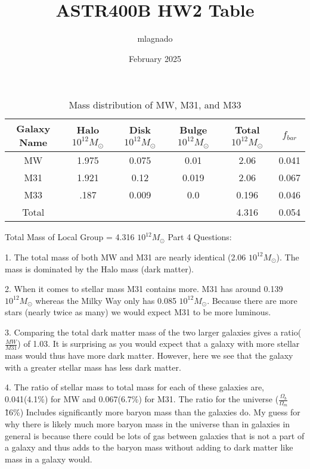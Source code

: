 \documentclass{article}
\title{ASTR400B HW2 Table}
\author{mlagnado }
\date{February 2025}
\begin{document}
\maketitle



    \begin{table}[h]
    \begin{tabular}{|c|c|c|c|c|c|} \hline  
         Galaxy Name&  Halo $10^{12} M_{\odot}$&   Disk $10^{12} M_{\odot}$&  Bulge $10^{12} M_{\odot}$&  Total $10^{12} M_{\odot}$& $f_{bar}$\\ \hline  
         MW&  1.975&  0.075&  0.01&  2.06& 0.041\\ \hline  
         M31&  1.921&  0.12&  0.019&  2.06& 0.067\\ \hline  
         M33&  .187&  0.009&  0.0&  0.196& 0.046\\ \hline  
         Total& & & &4.316& 0.054\\ \hline 
    \end{tabular}
    \caption{Mass distribution of MW, M31, and M33}
    \label{tab:my_label}
\end{table}

Total Mass of Local Group = 4.316 $10^{12} M_{\odot}$ \newline
\newline Part 4 Questions:

1. The total mass of both MW and M31 are nearly identical (2.06 $10^{12} M_{\odot}$). The mass is dominated by the Halo mass (dark matter).


2. When it comes to stellar mass M31 contains more. M31 has around 0.139 $10^{12} M_{\odot}$ whereas the Milky Way only has 0.085 $10^{12} M_{\odot}$. Because there are more stars (nearly twice as many) we would expect M31 to be more luminous.


3. Comparing the total dark matter mass of the two larger galaxies gives a ratio($\frac{MW}{M31}$) of 1.03. It is surprising as you would expect that a galaxy with more stellar mass would thus have more dark matter. However, here we see that the galaxy with a greater stellar mass has less dark matter.


4. The ratio of stellar mass to total mass for each of these galaxies are, 0.041(4.1\%) for MW and 0.067(6.7\%) for M31. The ratio for the universe ($\frac{\Omega_b}{\Omega_m}$ \~ 16\%) Includes significantly more baryon mass than the galaxies do. My guess for why there is likely much more baryon mass in the universe than in galaxies in general is because there could be lots of gas between galaxies that is not a part of a galaxy and thus adds to the baryon mass without adding to dark matter like mass in a galaxy would.
\end{document}

